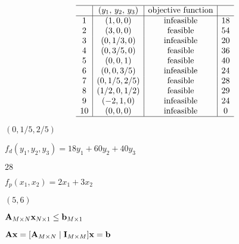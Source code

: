\documentclass{article}
\def\lthtmlcheckvsize{\ifdim\ht\sizebox<\vsize 
  \ifdim\wd\sizebox<\hsize\expandafter\hfill\fi \expandafter\vfill
  \else\expandafter\vss\fi}%
\begin{document}
{\newpage\clearpage
{}%
\begin{displaymath}\begin{array}{c|c|c|c}\hline
& (y_1,\,y_2,\,y_3)  & \mbox{objective function} \\\hline
1 & (1,0,0) & \mbox{infeasible}   & 18\\
2 & (3,0,0) & \mbox{feasible}   & 54\\
3 & (0,1/3,0) & \mbox{infeasible}   & 20\\
4 & (0,3/5,0) & \mbox{feasible}   & 36\\
5 & (0,0,1) & \mbox{feasible}   & 40\\
6 & (0,0,3/5) & \mbox{infeasible}   & 24\\
7 & (0,1/5,2/5) & \mbox{feasible}   & 28\\
8 & (1/2,0,1/2) & \mbox{feasible}   & 29\\
9 & (-2,1,0) & \mbox{infeasible}   & 24\\
10 & (0,0,0) & \mbox{infeasible}   & 0\\\hline
\end{array}\end{displaymath}%
\lthtmldisplayZ
\lthtmlcheckvsize\clearpage}

{\newpage\clearpage
{}%
$ (0,1/5,2/5)$%
\lthtmlindisplaymathZ
\lthtmlcheckvsize\clearpage}

{\newpage\clearpage
{}%
$ f_d(y_1,y_2,y_3)=18y_1+60y_2+40y_3$%
\lthtmlindisplaymathZ
\lthtmlcheckvsize\clearpage}

{\newpage\clearpage
{}%
$ 28$%
\lthtmlindisplaymathZ
\lthtmlcheckvsize\clearpage}

{\newpage\clearpage
{}%
$ f_p(x_1,x_2)=2x_1+3x_2$%
\lthtmlindisplaymathZ
\lthtmlcheckvsize\clearpage}

{\newpage\clearpage
{}%
$ (5,6)$%
\lthtmlindisplaymathZ
\lthtmlcheckvsize\clearpage}

{\newpage\clearpage
{}%
$ {\bf A}_{M\times N}{\bf x}_{N\times 1}\le{\bf b}_{M\times 1}$%
\lthtmlindisplaymathZ
\lthtmlcheckvsize\clearpage}

{\newpage\clearpage
{}%
$ {\bf Ax}=[{\bf A}_{M\times N}\;|\;{\bf I}_{M\times M}] {\bf x}={\bf b}$%
\lthtmlindisplaymathZ
\lthtmlcheckvsize\clearpage}
\end{document}
